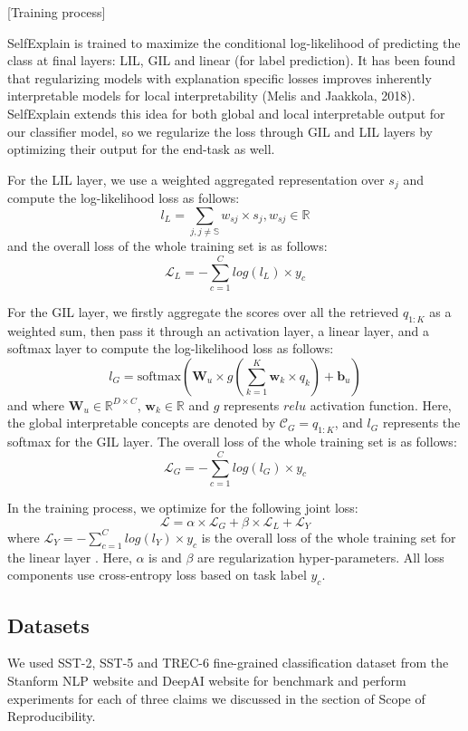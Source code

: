 \documentclass{article}
\begin{document}
[Training process]

SelfExplain is trained to maximize the conditional log-likelihood of predicting the class at final layers: LIL, GIL and linear (for label prediction). It has been found that regularizing models with explanation specific losses improves inherently interpretable models for local interpretability (Melis and Jaakkola,
2018). SelfExplain extends this idea for both global and local interpretable output for our classifier model, so we regularize the loss through GIL and LIL layers by optimizing their output for the end-task as well. 

For the LIL layer, we use a weighted aggregated representation over $s_j$ and compute the log-likelihood loss as follows:
$$l_L = \sum_{j, j \neq \mathbb{S}}{w_{sj} \times s_j}, w_{sj} \in \mathbb{R}$$
and the overall loss of the whole training set is as follows:
$$\mathcal{L}_L = - \sum_{c=1}^{C}{log(l_L)} \times {y_c}$$

For the GIL layer, we firstly aggregate the scores over all the retrieved $q_{1:K}$ as a weighted sum, then pass it through an activation layer, a linear layer, and a softmax layer to compute the log-likelihood loss as follows:
$$l_G = \textrm{softmax}(\mathbf{W}_u \times g(\sum_{k=1}^{K}{\mathbf{w}_k \times q_k}) + \textbf{b}_u)$$
and where $\mathbf{W}_u \in \mathbb{R}^{D \times C}$, $\mathbf{w}_k \in \mathbb{R}$ and $g$ represents $relu$ activation function. Here, the global interpretable concepts are denoted by $\mathcal{C}_G = q_{1:K}$, and $l_G$ represents the softmax for the GIL layer. The overall loss of the whole training set is as follows:
$$\mathcal{L}_G = - \sum_{c=1}^{C}{log(l_G)} \times {y_c}$$

In the training process, we optimize for the following joint loss:
$$\mathcal{L} = \alpha \times \mathcal{L}_G + \beta \times \mathcal{L}_L + \mathcal{L}_Y$$ 
where $\mathcal{L}_Y = - \sum_{c=1}^{C}{log(l_Y)} \times {y_c}$ is the overall loss of the whole training set for the linear layer . Here, $\alpha$ is and $\beta$ are regularization hyper-parameters. All loss components use cross-entropy loss based on task label $y_c$.



\subsection{Datasets}

We used SST-2, SST-5 and TREC-6 fine-grained classification dataset from the Stanform NLP website and DeepAI website for 
benchmark and perform experiments for each of three claims we discussed in the section of 
Scope of Reproducibility.
\end{document}

